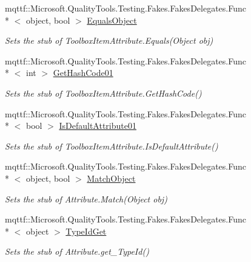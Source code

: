\begin{DoxyCompactItemize}
\item 
mqttf\-::\-Microsoft.\-Quality\-Tools.\-Testing.\-Fakes.\-Fakes\-Delegates.\-Func\\*
$<$ object, bool $>$ \hyperlink{class_system_1_1_component_model_1_1_fakes_1_1_stub_toolbox_item_attribute_a7f64e079eafae877bb5ccb1d48d45a83}{Equals\-Object}
\begin{DoxyCompactList}\small\item\em Sets the stub of Toolbox\-Item\-Attribute.\-Equals(\-Object obj)\end{DoxyCompactList}\item 
mqttf\-::\-Microsoft.\-Quality\-Tools.\-Testing.\-Fakes.\-Fakes\-Delegates.\-Func\\*
$<$ int $>$ \hyperlink{class_system_1_1_component_model_1_1_fakes_1_1_stub_toolbox_item_attribute_a8a6d1693053db2746407173bcc0ef499}{Get\-Hash\-Code01}
\begin{DoxyCompactList}\small\item\em Sets the stub of Toolbox\-Item\-Attribute.\-Get\-Hash\-Code()\end{DoxyCompactList}\item 
mqttf\-::\-Microsoft.\-Quality\-Tools.\-Testing.\-Fakes.\-Fakes\-Delegates.\-Func\\*
$<$ bool $>$ \hyperlink{class_system_1_1_component_model_1_1_fakes_1_1_stub_toolbox_item_attribute_ae4ba0663186e94924ff10dc6f2bb8969}{Is\-Default\-Attribute01}
\begin{DoxyCompactList}\small\item\em Sets the stub of Toolbox\-Item\-Attribute.\-Is\-Default\-Attribute()\end{DoxyCompactList}\item 
mqttf\-::\-Microsoft.\-Quality\-Tools.\-Testing.\-Fakes.\-Fakes\-Delegates.\-Func\\*
$<$ object, bool $>$ \hyperlink{class_system_1_1_component_model_1_1_fakes_1_1_stub_toolbox_item_attribute_a1b3b77258bc2acffbf939a5ac0ce6a65}{Match\-Object}
\begin{DoxyCompactList}\small\item\em Sets the stub of Attribute.\-Match(\-Object obj)\end{DoxyCompactList}\item 
mqttf\-::\-Microsoft.\-Quality\-Tools.\-Testing.\-Fakes.\-Fakes\-Delegates.\-Func\\*
$<$ object $>$ \hyperlink{class_system_1_1_component_model_1_1_fakes_1_1_stub_toolbox_item_attribute_a2a7c5e7b52d13153c2b56c0bad1d7a7d}{Type\-Id\-Get}
\begin{DoxyCompactList}\small\item\em Sets the stub of Attribute.\-get\-\_\-\-Type\-Id()\end{DoxyCompactList}\end{DoxyCompactItemize}
